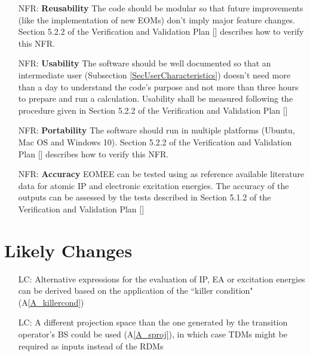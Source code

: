 \documentclass[12pt]{article}
\newcommand{\aref}[1]{A\ref{#1}}
\newcounter{nfrnum} %
\newcounter{lcnum} %
\begin{document}
\noindent \begin{itemize}

\item[NFR\refstepcounter{nfrnum}\thenfrnum \label{NFR_Reusability}:]
\textbf{Reusability} The code should be modular so that future improvements 
(like the implementation of new EOMs) don't imply major feature changes. 
Section 5.2.2 of the Verification and Validation Plan 
[\cite{VnV2020}] describes how to verify this NFR.

\item[NFR\refstepcounter{nfrnum}\thenfrnum \label{NFR_Usability}:] 
\textbf{Usability} The software should be well documented so that an 
intermediate user (Subsection \ref{SecUserCharacteristics}) doesn't need 
more than a day 
to understand the code's purpose and not more than three hours to prepare and 
run a calculation. Usability shall be measured following the procedure given in 
Section 5.2.2 of the Verification and Validation Plan [\cite{VnV2020}]

\item[NFR\refstepcounter{nfrnum}\thenfrnum \label{NFR_Portability}:]
\textbf{Portability} The software should run in multiple platforms (Ubuntu, Mac 
OS and Windows 10). Section 5.2.2 of the Verification and Validation Plan 
[\cite{VnV2020}] describes how to verify this NFR.

\item[NFR\refstepcounter{nfrnum}\thenfrnum \label{NFR_Accuracy}:]
\textbf{Accuracy} EOMEE can be tested using as reference available literature 
data for atomic IP and electronic excitation energies. The accuracy of the 
outputs can be assessed by the tests described in Section 5.1.2 of the 
Verification and Validation Plan [\cite{VnV2020}]
\end{itemize}

\section{Likely Changes}    

\noindent \begin{itemize}

\item[LC\refstepcounter{lcnum}\thelcnum\label{LC_newEOMs}:] Alternative 
expressions for the evaluation of IP, EA or excitation energies can be derived 
based on the application of the ``killer condition" (\aref{A_killercond})

\item[LC\refstepcounter{lcnum}\thelcnum\label{LC_asymmetricEOMs}:] A different 
projection space than the one generated by the transition operator's BS could 
be used (\aref{A_sproj}), in which case TDMs might be required as inputs 
instead of the RDMs 



\end{itemize}
\end{document}

